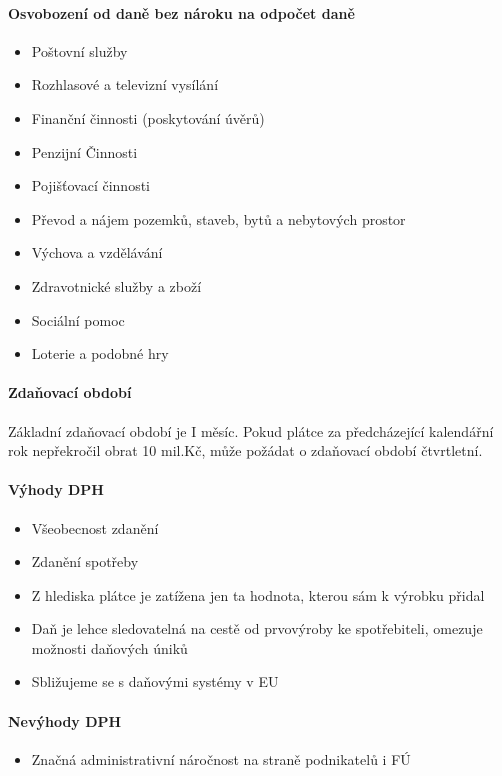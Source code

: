 \paragraph{Osvobození od daně bez nároku na odpočet daně}
\begin{itemize}
    \item Poštovní služby
    \item Rozhlasové a televizní vysílání
    \item Finanční činnosti (poskytování úvěrů)
    \item Penzijní Činnosti
    \item Pojišťovací činnosti
    \item Převod a nájem pozemků, staveb, bytů a nebytových prostor
    \item Výchova a vzdělávání
    \item Zdravotnické služby a zboží
    \item Sociální pomoc
    \item Loterie a podobné hry
\end{itemize}

\paragraph{Zdaňovací období}
Základní zdaňovací období je I měsíc. Pokud plátce za předcházející kalendářní rok nepřekročil obrat 10 mil.Kč, může požádat o zdaňovací období čtvrtletní.

\paragraph{Výhody DPH}
\begin{itemize}   
    \item Všeobecnost zdanění
    \item Zdanění spotřeby
    \item Z hlediska plátce je zatížena jen ta hodnota, kterou sám k výrobku přidal
    \item Daň je lehce sledovatelná na cestě od prvovýroby ke spotřebiteli, omezuje možnosti daňových úniků
    \item Sbližujeme se s daňovými systémy v EU
\end{itemize}

\paragraph{Nevýhody DPH}
\begin{itemize}
    \item Značná administrativní náročnost na straně podnikatelů i FÚ
\end{itemize}

